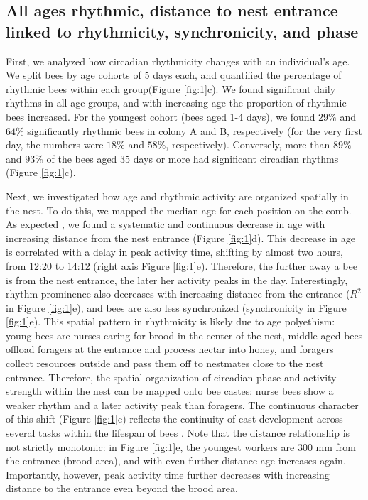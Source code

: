 \documentclass{article}
\begin{document}
\subsection{All ages rhythmic, distance to nest entrance linked to rhythmicity, synchronicity, and phase}
First, we analyzed how circadian rhythmicity changes with an individual’s age. We split bees by age cohorts of 5 days each, and quantified the percentage of rhythmic bees within each group(Figure \ref{fig:1}c). We found significant daily rhythms in all age groups, and with increasing age the proportion of rhythmic bees increased. For the youngest cohort (bees aged 1-4 days), we found $29\%$ and $64\%$ significantly rhythmic bees in colony A and B, respectively (for the very first day, the numbers were $18\%$ and $58\%$, respectively). Conversely, more than $89\%$ and $93\%$ of the bees aged 35 days or more had significant circadian rhythms (Figure \ref{fig:1}c).

Next, we investigated how age and rhythmic activity are organized spatially in the nest. To do this, we mapped the median age for each position on the comb. As expected \cite{von_frisch_tanze_1965, seeley_wisdom_1995}, we found a systematic and continuous decrease in age with increasing distance from the nest entrance (Figure \ref{fig:1}d). This decrease in age is correlated with a delay in peak activity time, shifting by almost two hours, from 12:20 to 14:12 (right axis Figure \ref{fig:1}e). Therefore, the further away a bee is from the nest entrance, the later her activity peaks in the day. Interestingly, rhythm prominence also decreases with increasing distance from the entrance ($R^2$ in Figure \ref{fig:1}e), and bees are also less synchronized (synchronicity in Figure \ref{fig:1}e). This spatial pattern in rhythmicity is likely due to age polyethism: young bees are nurses caring for brood in the center of the nest, middle-aged bees offload foragers at the entrance and process nectar into honey, and foragers collect resources outside and pass them off to nestmates close to the nest entrance. Therefore, the spatial organization of circadian phase and activity strength within the nest can be mapped onto bee castes: nurse bees show a weaker rhythm and a later activity peak than foragers. The continuous character of this shift (Figure \ref{fig:1}e) reflects the continuity of cast development across several tasks within the lifespan of bees \cite{wild_social_2021}. 
Note that the distance relationship is not strictly monotonic: in Figure \ref{fig:1}e, the youngest workers are 300 mm from the entrance (brood area), and with even further distance age increases again. Importantly, however, peak activity time further decreases with increasing distance to the entrance even beyond the brood area.  
\end{document}
